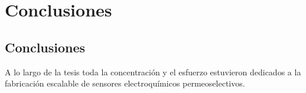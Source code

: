  \newcommand{\NoBiblioConc}[1]{
 \ifthenelse{\equal{#1}{verdadero}}{}{}
 \NoBiblioConc{verdadero}}

 	
 \FormatoCapituloUnaLinea
 
 \chapter{Conclusiones}
 \label{chap:Conclusiones}

 \thispagestyle{empty}
	


 \vfill
 \minitoc
 \newpage

\section{Conclusiones}

A lo largo de la tesis toda la concentración y el esfuerzo estuvieron dedicados a la fabricación escalable de sensores electroquímicos permeoselectivos. 

